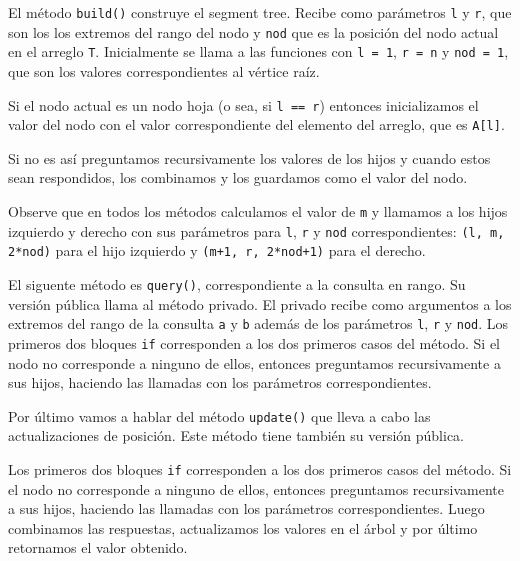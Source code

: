 \raggedbottom

El m\'etodo \texttt{build()} construye el segment tree. Recibe como par\'ametros \texttt{l} y \texttt{r}, que son los los extremos del rango del nodo y \texttt{nod} que es la posici\'on del nodo actual en el arreglo \texttt{T}. Inicialmente se llama a las funciones con \texttt{l = 1}, \texttt{r = n} y \texttt{nod = 1}, que son los valores correspondientes al v\'ertice ra\'iz.
  
Si el nodo actual es un nodo hoja (o sea, si \texttt{l == r}) entonces inicializamos el valor del nodo con el valor correspondiente del elemento del arreglo, que es \texttt{A[l]}.

Si no es as\'i preguntamos recursivamente los valores de los hijos y cuando estos sean respondidos, los combinamos y los guardamos como el valor del nodo.

Observe que en todos los m\'etodos calculamos el valor de \texttt{m} y llamamos a los hijos izquierdo y derecho con sus par\'ametros para \texttt{l}, \texttt{r} y \texttt{nod} correspondientes: \texttt{(l, m, 2*nod)} para el hijo izquierdo y \texttt{(m+1, r, 2*nod+1)} para el derecho.
\raggedbottom

El siguente m\'etodo es \texttt{query()}, correspondiente a la consulta en rango. Su versi\'on p\'ublica llama al m\'etodo privado. El privado recibe como argumentos a los extremos del rango de la consulta \texttt{a} y \texttt{b} adem\'as de los par\'ametros \texttt{l}, \texttt{r} y \texttt{nod}. Los primeros dos bloques \texttt{if} corresponden a los dos primeros casos del m\'etodo. Si el nodo no corresponde a ninguno de ellos, entonces preguntamos recursivamente a sus hijos, haciendo las llamadas con los par\'ametros correspondientes.

\raggedbottom

Por \'ultimo vamos a hablar del m\'etodo \texttt{update()} que lleva a cabo las actualizaciones de posici\'on. Este m\'etodo tiene tambi\'en su versi\'on p\'ublica.

Los primeros dos bloques \texttt{if} corresponden a los dos primeros casos del m\'etodo. Si el nodo no corresponde a ninguno de ellos, entonces preguntamos recursivamente a sus hijos, haciendo las llamadas con los par\'ametros correspondientes. Luego combinamos las respuestas, actualizamos los valores en el \'arbol y por \'ultimo retornamos el valor obtenido.


\raggedbottom